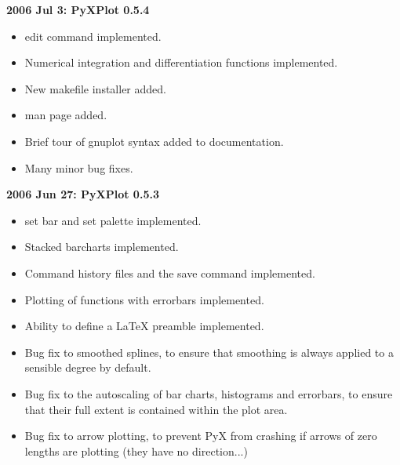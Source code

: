 \documentclass[a4paper,onecolumn,11pt]{book}
\begin{document}
\noindent \textbf{2006 Jul 3: PyXPlot 0.5.4}
\begin{itemize}
\item edit command implemented.
\item Numerical integration and differentiation functions implemented.
\item New makefile installer added.
\item man page added.
\item Brief tour of gnuplot syntax added to documentation.
\item Many minor bug fixes.
\end{itemize}

\noindent \textbf{2006 Jun 27: PyXPlot 0.5.3}
\begin{itemize}
\item set bar and set palette implemented.
\item Stacked barcharts implemented.
\item Command history files and the save command implemented.
\item Plotting of functions with errorbars implemented.
\item Ability to define a LaTeX preamble implemented.
\item Bug fix to smoothed splines, to ensure that smoothing is always applied to a sensible degree by default.
\item Bug fix to the autoscaling of bar charts, histograms and errorbars, to ensure that their full extent is contained within the plot area.
\item Bug fix to arrow plotting, to prevent PyX from crashing if arrows of zero lengths are plotting (they have no direction...)
\end{itemize}
\end{document}
